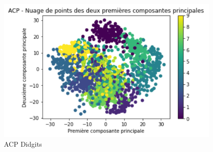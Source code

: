 \documentclass{beamer}
\theoremstyle{definition}
\begin{document}
\begin{frame}
\begin{minipage}[t]{1\linewidth}
\begin{minipage}[t]{0.3\linewidth}
\begin{figure}
	\end{figure}\end{minipage}\hfil \begin{minipage}[t]{0.3\linewidth}\centering\begin{figure}
\begin{center}
	\includegraphics[scale=0.2]{acp_digits.png}			
	\caption*{ACP Didgits}
\end{center}

\end{figure}\end{minipage}
\end{minipage}


	
\end{frame}
\end{document}
